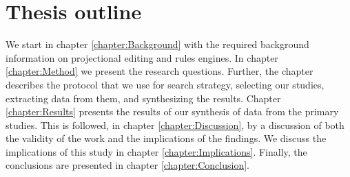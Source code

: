 \section{Thesis outline}

We start in chapter \ref{chapter:Background} with the required background information on projectional editing and rules engines.
In chapter \ref{chapter:Method} we present the research questions.
Further, the chapter describes the protocol that we use for search strategy, selecting our studies, extracting data from them, and synthesizing the results.
Chapter \ref{chapter:Results} presents the results of our synthesis of data from the primary studies.
This is followed, in chapter \ref{chapter:Discussion}, by a discussion of both the validity of the work and the implications of the findings.
We discuss the implications of this study in chapter \ref{chapter:Implications}.
Finally, the conclusions are presented in chapter \ref{chapter:Conclusion}.
